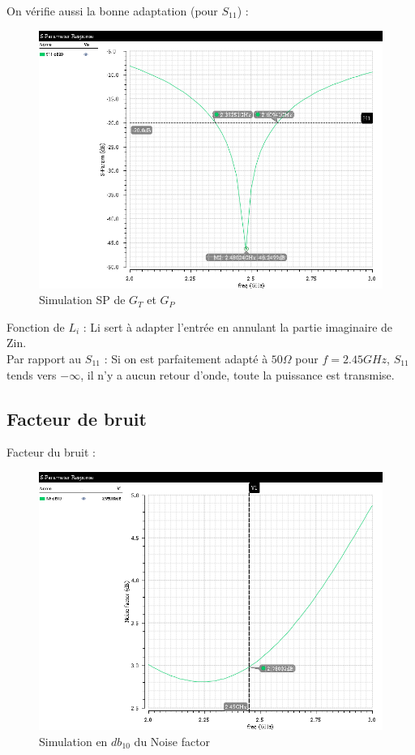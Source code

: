 \documentclass[a4paper]{article}
\begin{document}
On v\'erifie aussi la bonne adaptation (pour $S_{11}$) :


\begin{figure}[!htb]
\begin{center}
  \includegraphics[scale=0.45]{Q5-S11-db20.png}
  \caption{Simulation SP de $G_T$ et $G_P$  }
  \label{sim-q5}
\end{center}
\end{figure}

Fonction de $L_i$ : Li sert \`a adapter l'entr\'ee en annulant la partie imaginaire de Zin.\\
Par rapport au $S_{11}$ :  Si on est parfaitement adapt\'e \`a $50 \Omega$  pour $f= 2.45GHz$, $S_{11}$ tends vers
$-\infty$, il n'y a aucun retour d'onde, toute la puissance est transmise.

\clearpage
\subsection{Facteur de bruit}

Facteur du bruit :

\begin{figure}[!htb]
\begin{center}
  \includegraphics[scale=0.45]{Q6-NF-dB10.png}
  \caption{Simulation en $db_{10}$ du Noise factor}
  \label{facteur-bruit}
\end{center}
\end{figure}
\end{document}
